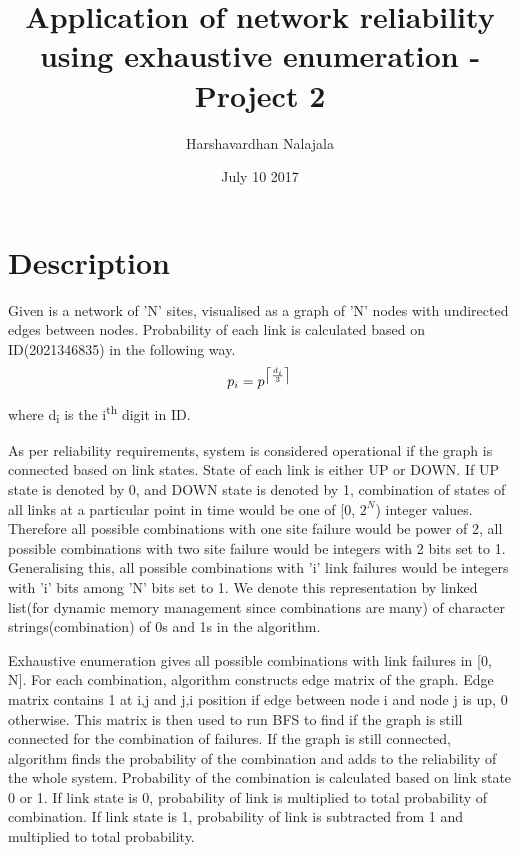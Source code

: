 \documentclass[11pt]{article}
\title{Application of network reliability using exhaustive enumeration - Project 2}
\author{Harshavardhan Nalajala}
\date{July 10 2017}
\DeclarePairedDelimiter\ceil{\lceil}{\rceil}
\begin{document}
\maketitle
 \tableofcontents
 \section{Description}
Given is a network of 'N' sites, visualised as a graph of 'N' nodes with undirected edges between nodes. Probability of each link is calculated based on ID(2021346835) in the following way.
\begin{equation}
	 p_i = p^{\ceil*{\frac{d_i}{3}}}
\end{equation}
where d\textsubscript{i} is the i\textsuperscript{th} digit in ID.
 \par
 As per reliability requirements, system is considered operational if the graph is connected based on link states. State of each link is either UP or DOWN. If UP state is denoted by 0, and DOWN state is denoted by 1, combination of states of all links at a particular point in time would be one of [0, $2^{N}$) integer values. Therefore all possible combinations with one site failure would be power of 2, all possible combinations with two site failure would be integers with 2 bits set to 1. Generalising this, all possible combinations with 'i' link failures would be integers with 'i' bits among 'N' bits set to 1. We denote this representation by linked list(for dynamic memory management since combinations are many) of character strings(combination) of 0s and 1s in the algorithm.
 \par
Exhaustive enumeration gives all possible combinations with link failures in [0, N]. For each combination, algorithm constructs edge matrix of the graph. Edge matrix contains 1 at i,j and j,i position if edge between node i and node j is up, 0 otherwise. This matrix is then used to run BFS to find if the graph is still connected for the combination of failures. If the graph is still connected, algorithm finds the probability of the combination and adds to the reliability of the whole system. Probability of the combination is calculated based on link state 0 or 1. If link state is 0, probability of link is multiplied to total probability of combination. If link state is 1, probability of link is subtracted from 1 and multiplied to total probability.
\end{document}

